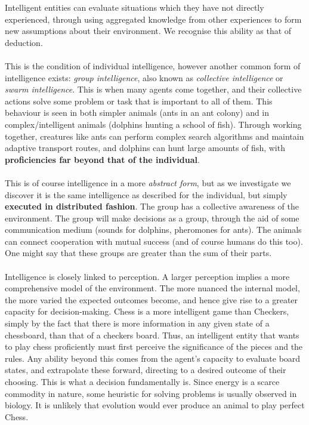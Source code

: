 \documentclass[10pt,a4paper]{article}
\begin{document}
				Intelligent entities can evaluate situations which they have not directly experienced, through using aggregated knowledge from other experiences to form new assumptions about their environment. We recognise this ability as that of deduction.
				\\\\
				This is the condition of individual intelligence, however another common form of intelligence exists: \textsl{group intelligence}, also known as \textsl{collective intelligence} or \textsl{swarm intelligence}. This is when many agents come together, and their collective actions solve some problem or task that is important to all of them. This behaviour is seen in both simpler animals (ants in an ant colony) and in complex/intelligent animals (dolphins hunting a school of fish). Through working together, creatures like ants can perform complex search algorithms and maintain adaptive transport routes, and dolphins can hunt large amounts of fish, with \textbf{proficiencies far beyond that of the individual}. 
				\\\\
				This is of course intelligence in a more \textsl{abstract form}, but as we investigate we discover it is the same intelligence as described for the individual, but simply \textbf{executed in distributed fashion}. The group has a collective awareness of the environment. The group will make decisions as a group, through the aid of some communication medium (sounds for dolphins, pheromones for ants). The animals can connect cooperation with mutual success (and of course humans do this too). One might say that these groups are greater than the sum of their parts.
				\\\\
				Intelligence is closely linked to perception. A larger perception implies a more comprehensive model of the environment. The more nuanced the internal model, the more varied the expected outcomes become, and hence give rise to a greater capacity for decision-making. Chess is a more intelligent game than Checkers, simply by the fact that there is more information in any given state of a chessboard, than that of a checkers board. Thus, an intelligent entity that wants to play chess proficiently must first perceive the significance of the pieces and the rules. Any ability beyond this comes from the agent's capacity to evaluate board states, and extrapolate these forward, directing to a desired outcome of their choosing. This is what a decision fundamentally is. Since energy is a scarce commodity in nature, some heuristic for solving problems is usually observed in biology. It is unlikely that evolution would ever produce an animal to play perfect Chess.
\end{document}
